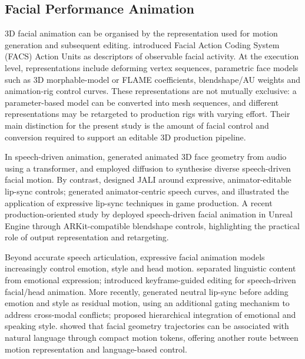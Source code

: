 \documentclass[11pt,a4paper]{article}
\begin{document}
\subsection{Facial Performance Animation}

3D facial animation can be organised by the representation used for motion generation and subsequent editing. \citet{ekman2002facs} introduced Facial Action Coding System (FACS) Action Units as descriptors of observable facial activity. At the execution level, representations include deforming vertex sequences, parametric face models such as 3D morphable-model or FLAME coefficients, blendshape/AU weights and animation-rig control curves. These representations are not mutually exclusive: a parameter-based model can be converted into mesh sequences, and different representations may be retargeted to production rigs with varying effort. Their main distinction for the present study is the amount of facial control and conversion required to support an editable 3D production pipeline.

In speech-driven animation, \citet{fan2022faceformer} generated animated 3D face geometry from audio using a transformer, and \citet{stan2023facediffuser} employed diffusion to synthesise diverse speech-driven facial motion. By contrast, \citet{edwards2016jali} designed JALI around expressive, animator-editable lip-sync controls; \citet{zhou2018visemenet} generated animator-centric speech curves, and \citet{edwards2020cyberpunk} illustrated the application of expressive lip-sync techniques in game production. A recent production-oriented study by \citet{busacchi2026unreal} deployed speech-driven facial animation in Unreal Engine through ARKit-compatible blendshape controls, highlighting the practical role of output representation and retargeting.

Beyond accurate speech articulation, expressive facial animation models increasingly control emotion, style and head motion. \citet{peng2023emotalk} separated linguistic content from emotional expression; \citet{thambiraja2025diface} introduced keyframe-guided editing for speech-driven facial/head animation. More recently, \citet{yang2026destalker} generated neutral lip-sync before adding emotion and style as residual motion, using an additional gating mechanism to address cross-modal conflicts; \citet{yang2026hiftalker} proposed hierarchical integration of emotional and speaking style. \citet{song2026tdmm} showed that facial geometry trajectories can be associated with natural language through compact motion tokens, offering another route between motion representation and language-based control.
\end{document}
